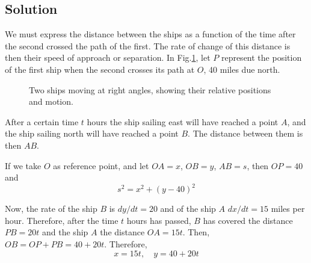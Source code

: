 \subsection*{Solution}
We must express the distance between the ships as a function of the time after the second crossed the path of the first. The rate of change of this distance is then their speed of approach or separation. In Fig.\ref{fig:ships}, let $P$ represent the position of the first ship when the second crosses its path at $O$, 40 miles due north.

\begin{figure}[h]
    \centering
    \caption{Two ships moving at right angles, showing their relative positions and motion.}
    \label{fig:ships}
\end{figure}

After a certain time $t$ hours the ship sailing east will have reached a point $A$, and the ship sailing north will have reached a point $B$. The distance between them is then $AB$.

If we take $O$ as reference point, and let $OA = x$, $OB = y$, $AB = s$, then $OP = 40$ and
\[s^2 = x^2 + (y-40)^2 \tag{a}\]

Now, the rate of the ship $B$ is $dy/dt = 20$ and of the ship $A$ $dx/dt = 15$ miles per hour. Therefore, after the time $t$ hours has passed, $B$ has covered the distance $PB = 20t$ and the ship $A$ the distance $OA = 15t$. Then, $OB = OP + PB = 40 + 20t$. Therefore,
\[x = 15t, \quad y = 40 + 20t \tag{b}\]

